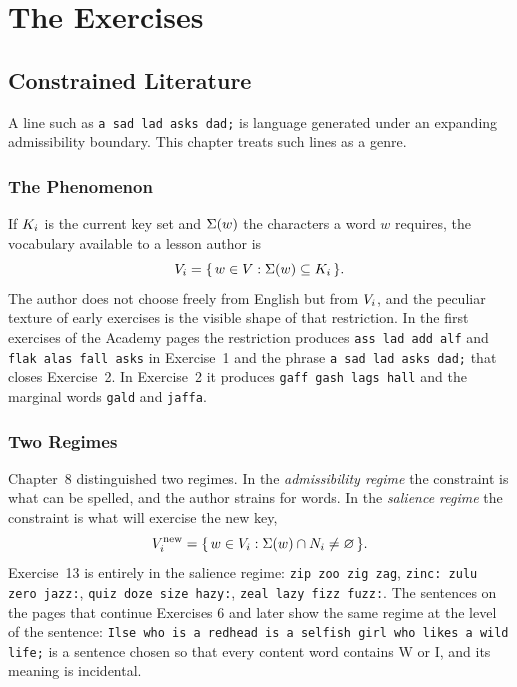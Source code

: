 \part{The Exercises}

\chapter{Constrained Literature}
\label{ch:constrained}

A line such as \texttt{a sad lad asks dad;} is language generated under an expanding admissibility boundary. This chapter treats such lines as a genre.

\section{The Phenomenon}

If $K_i$ is the current key set and $\Sigma(w)$ the characters a word $w$ requires, the vocabulary available to a lesson author is
\[
V_i=\{\,w\in V:\Sigma(w)\subseteq K_i\,\}.
\]
The author does not choose freely from English but from $V_i$, and the peculiar texture of early exercises is the visible shape of that restriction. In the first exercises of the Academy pages the restriction produces \texttt{ass lad add alf} and \texttt{flak alas fall asks} in Exercise~1 and the phrase \texttt{a sad lad asks dad;} that closes Exercise~2. In Exercise~2 it produces \texttt{gaff gash lags hall} and the marginal words \texttt{gald} and \texttt{jaffa}.

\section{Two Regimes}

Chapter~8 distinguished two regimes. In the \emph{admissibility regime} the constraint is what can be spelled, and the author strains for words. In the \emph{salience regime} the constraint is what will exercise the new key,
\[
V_i^{\mathrm{new}}=\{\,w\in V_i:\Sigma(w)\cap N_i\neq\varnothing\,\}.
\]
Exercise~13 is entirely in the salience regime: \texttt{zip zoo zig zag}, \texttt{zinc: zulu zero jazz:}, \texttt{quiz doze size hazy:}, \texttt{zeal lazy fizz fuzz:}. The sentences on the pages that continue Exercises 6 and later show the same regime at the level of the sentence: \texttt{Ilse who is a redhead is a selfish girl who likes a wild life;} is a sentence chosen so that every content word contains W or I, and its meaning is incidental.

